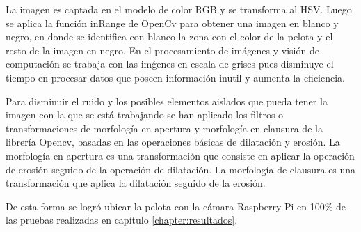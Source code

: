 La imagen es captada en el modelo de color RGB y se transforma al HSV. Luego se aplica la función inRange de OpenCv para obtener una imagen en blanco y negro, en donde se identifica con blanco la zona con el color de la pelota y el resto de la imagen en negro. En el procesamiento de im\'agenes y visi\'on de computaci\'on se trabaja con las im\'genes en escala de grises pues disminuye el tiempo en procesar datos que poseen informaci\'on inutil y aumenta la eficiencia.

Para disminuir el ruido y los posibles elementos aislados que pueda tener la imagen con la que se está trabajando se han aplicado los filtros o transformaciones de morfología en apertura y morfología en clausura de la librería Opencv, basadas en las operaciones básicas de dilatación y erosión. La morfología en apertura es una transformación que consiste en aplicar la operación de erosión seguido de la operación de dilatación. La morfología de clausura es una transformación que aplica la dilatación seguido de la erosión.

De esta forma se logró ubicar la pelota con la cámara Raspberry Pi en 100\% de las pruebas realizadas en cap\'itulo \ref{chapter:resultados}.


